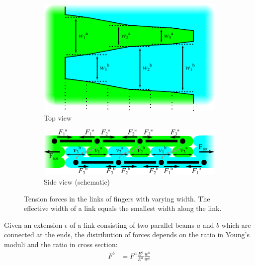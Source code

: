 \begin{figure}
	\centering
	\begin{subfigure}{\columnwidth}
		\includegraphics[width=\columnwidth]{sources/method/varying_width_fingers.pdf}
		\caption{Top view}
	\end{subfigure}
	\begin{subfigure}{\columnwidth}
		\includegraphics[width=\columnwidth]{sources/method/stress_distribution.pdf}
		\caption{Side view (schematic)}
	\end{subfigure}
	\caption{Tension forces in the links of fingers with varying width. The effective width of a link equals the smallest width along the link.}
	\label{fig:force_distribution}
\end{figure}


Given an extension $\epsilon$ of a link consisting of two parallel beams $a$ and $b$ which are connected at the ends,
the distribution of forces depends on the ratio in Young's moduli and the ratio in cross section:
\begin{align}
	F^b &= F^a \frac{E^b}{E^a} \frac{w^b}{w^a} \label{eq:double_beam_force_distribution}
\end{align}












